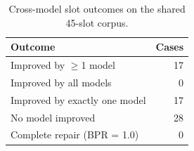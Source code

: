 \begin{table}[htbp]
\centering
\caption{Cross-model slot outcomes on the shared 45-slot corpus.}
\label{tab:cross-model}
\small
\begin{tabular}{@{}lr@{}}
\toprule
Outcome & Cases \\
\midrule
Improved by $\geq$1 model & 17 \\
Improved by all models & 0 \\
Improved by exactly one model & 17 \\
No model improved & 28 \\
Complete repair (BPR = 1.0) & 0 \\
\bottomrule
\end{tabular}
\end{table}

